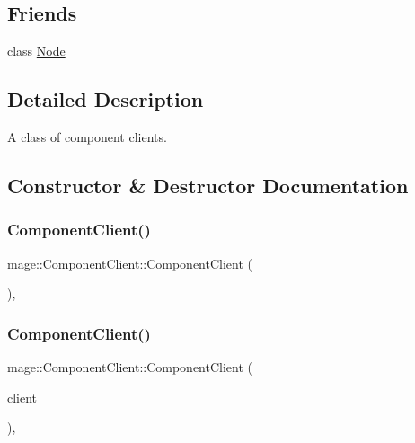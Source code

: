 \subsection*{Friends}
\begin{DoxyCompactItemize}
\item 
class \hyperlink{classmage_1_1_component_client_a6db9d28bd448a131448276ee03de1e6d}{Node}
\end{DoxyCompactItemize}


\subsection{Detailed Description}
A class of component clients. 

\subsection{Constructor \& Destructor Documentation}
\hypertarget{classmage_1_1_component_client_a745e1b2adcddb20ef288a6bda1ceecb9}{}\label{classmage_1_1_component_client_a745e1b2adcddb20ef288a6bda1ceecb9} 
\subsubsection{\texorpdfstring{Component\+Client()}{ComponentClient()}\hspace{0.1cm}{\footnotesize\ttfamily [1/3]}}
{\footnotesize\ttfamily mage\+::\+Component\+Client\+::\+Component\+Client (\begin{DoxyParamCaption}{ }\end{DoxyParamCaption})\hspace{0.3cm}{\ttfamily [private]}, {\ttfamily [delete]}}

\hypertarget{classmage_1_1_component_client_a5c8ba304aafac26964e36892cf19187c}{}\label{classmage_1_1_component_client_a5c8ba304aafac26964e36892cf19187c} 
\subsubsection{\texorpdfstring{Component\+Client()}{ComponentClient()}\hspace{0.1cm}{\footnotesize\ttfamily [2/3]}}
{\footnotesize\ttfamily mage\+::\+Component\+Client\+::\+Component\+Client (\begin{DoxyParamCaption}\item[{const \hyperlink{classmage_1_1_component_client}{Component\+Client} \&}]{client }\end{DoxyParamCaption})\hspace{0.3cm}{\ttfamily [private]}, {\ttfamily [delete]}}

